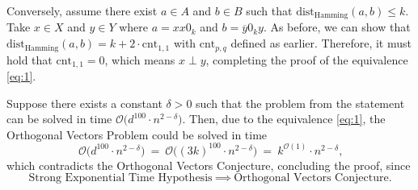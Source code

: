 \documentclass[12pt]{article}
\begin{document}
	\medskip
	
	Conversely, assume there exist \(a \in A\) and \(b \in B\) such that
	\(\text{dist}_{\text{Hamming}}(a, b) \leqslant k\). Take \(x \in X\) and \(y
	\in Y\) where \(a = xx0_{k}\) and \(b = \overline{y}0_{k}y\). As before, we
	can show that \(\text{dist}_{\text{Hamming}}(a, b) = k + 2 \cdot
	\text{cnt}_{1, 1}\) with \(\text{cnt}_{p, q}\) defined as earlier.
	Therefore, it must hold that \(\text{cnt}_{1, 1} = 0\), which means \(x
	\perp y\), completing the proof of the equivalence \eqref{eq:1}.
	
	\medskip
	
	Suppose there exists a constant \(\delta > 0\) such that the problem from
	the statement can be solved in time \(\mathcal{O} \big( d^{100} \cdot n^{2 -
	\delta} \big)\). Then, due to the equivalence \eqref{eq:1}, the Orthogonal
	Vectors Problem could be solved in time
	\[ \mathcal{O} \big( d^{100} \cdot n^{2 - \delta} \big) \ = \ \mathcal{O}
	\big( (3k)^{100} \cdot n^{2 - \delta} \big) \ = \ k^{\mathcal{O}(1)} \cdot
	n^{2 - \delta} \text{,} \]
	which contradicts the Orthogonal Vectors Conjecture, concluding the proof,
	since
	\[ \text{Strong Exponential Time Hypothesis} \ \implies \
	\text{Orthogonal Vectors Conjecture.} \]
\end{document}
